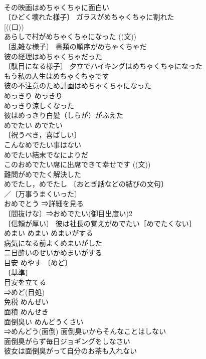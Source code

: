 \documentclass[8pt]{extreport}
\begin{document}
\begin{CJK}{UTF8}{min}
\\	その映画はめちゃくちゃに面白い 
\\	〔ひどく壊れた様子〕 ガラスがめちゃくちゃに割れた 
\\	[((口))
\\	あらしで村がめちゃくちゃになった ((文)) 
\\	〔乱雑な様子〕 書類の順序がめちゃくちゃだ 
\\	彼の経理はめちゃくちゃだった 
\\	〔駄目になる様子〕 夕立でハイキングはめちゃくちゃになった 
\\	もう私の人生はめちゃくちゃです 
\\	彼の不注意のため計画はめちゃくちゃになった 
\\	めっきり	めっきり	
\\	めっきり涼しくなった 
\\	彼はめっきり白髪（しらが）がふえた 
\\	めでたい	めでたい	
\\	〔祝うべき，喜ばしい〕
\\	こんなめでたい事はない 
\\	めでたい結末でなによりだ 
\\	このおめでたい席に出席できて幸せです ((文)) 
\\	難問がめでたく解決した 
\\	めでたし，めでたし 〔おとぎ話などの結びの文句〕
\\	／〔万事うまくいった〕
\\	おめでとう ⇒詳細を見る 
\\	〔間抜けな〕⇒おめでたい(御目出度い)2 
\\	〔信頼が厚い〕 彼は社長の覚えがめでたい［めでたくない］ 
\\	めまい	めまい	めまいがする 
\\	病気になる前よくめまいがした 
\\	二日酔いのせいかめまいがする 
\\	目安	めやす	〔めど〕
\\	〔基準〕
\\	目安を立てる 
\\	⇒めど(目処)　
\\	免税	めんぜい	
\\	面積	めんせき	
\\	面倒臭い	めんどうくさい	
\\	⇒めんどう(面倒) 面倒臭いからそんなことはしない 
\\	面倒臭がらず毎日ジョギングをしなさい 
\\	彼女は面倒臭がって自分のお茶も入れない 

\end{CJK}
\end{document}

